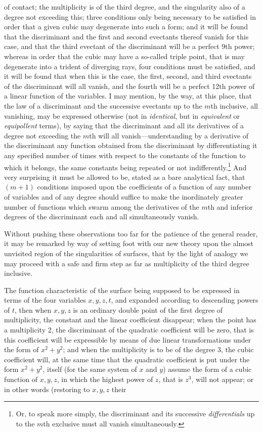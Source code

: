 \documentclass[11pt]{article}
\newcommand{\sourcepage}[1]{\marginpar{\scriptsize p.~#1}}
\begin{document}
\sourcepage{374}
of contact; the multiplicity is of the third degree, and the singularity also of a degree not exceeding this; three conditions only being necessary to be satisfied in order that a given cubic may degenerate into such a form; and it will be found that the discriminant and the first and second evectants thereof vanish for this case, and that the third evectant of the discriminant will be a perfect 9th power; whereas in order that the cubic may have a so-called triple point, that is may degenerate into a trident of diverging rays, four conditions must be satisfied, and it will be found that when this is the case, the first, second, and third evectants of the discriminant will all vanish, and the fourth will be a perfect 12th power of a linear function of the variables. I may mention, by the way, at this place, that the law of a discriminant and the successive evectants up to the $m$th inclusive, all vanishing, may be expressed otherwise (not in \emph{identical}, but in \emph{equivalent} or \emph{equipollent} terms), by saying that the discriminant and all its derivatives of a degree not exceeding the $m$th will all vanish---understanding by a derivative of the discriminant any function obtained from the discriminant by differentiating it any specified number of times with respect to the constants of the function to which it belongs, the same constants being repeated or not indifferently.\footnote{Or, to speak more simply, the discriminant and its successive \emph{differentials} up to the $m$th exclusive must all vanish simultaneously.} And very surprising it must be allowed to be, stated as a bare analytical fact, that $(m+1)$ conditions imposed upon the coefficients of a function of any number of variables and of any degree should suffice to make the inordinately greater number of functions which swarm among the derivatives of the $m$th and inferior degrees of the discriminant each and all simultaneously vanish.

Without pushing these observations too far for the patience of the general reader, it may be remarked by way of setting foot with our new theory upon the almost unvisited region of the singularities of surfaces, that by the light of analogy we may proceed with a safe and firm step as far as multiplicity of the third degree inclusive.

The function characteristic of the surface being supposed to be expressed in terms of the four variables $x,y,z,t$, and expanded according to descending powers of $t$, then when $x,y,z$ is an ordinary double point of the first degree of multiplicity, the constant and the linear coefficient disappear; when the point has a multiplicity 2, the discriminant of the quadratic coefficient will be zero, that is this coefficient will be expressible by means of due linear transformations under the form of $x^2+y^2$; and when the multiplicity is to be of the degree 3, the cubic coefficient will, at the same time that the quadratic coefficient is put under the form $x^2+y^2$, itself (for the same system of $x$ and $y$) assume the form of a cubic function of $x,y,z$, in which the highest power of $z$, that is $z^3$, will not appear; or in other words (restoring to $x,y,z$ their
\end{document}

